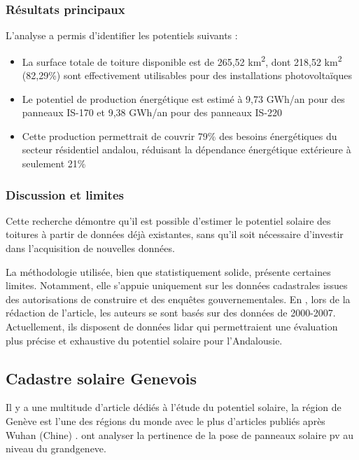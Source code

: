 \subsubsection{Résultats principaux}
\par{L'analyse a permis d'identifier les potentiels suivants :}
\begin{itemize}
    \item La surface totale de toiture disponible est de 265,52 \si{\unit{km^2}}, dont 218,52 \si{\unit{km^2}} (82,29\%) sont effectivement utilisables pour des installations photovoltaïques
    \item Le potentiel de production énergétique est estimé à 9,73 \si{\unit{GWh/an}} pour des panneaux IS-170 et 9,38 \si{\unit{GWh/an}} pour des panneaux IS-220
    \item Cette production permettrait de couvrir 79\% des besoins énergétiques du secteur résidentiel andalou, réduisant la dépendance énergétique extérieure à seulement 21\%
\end{itemize}

\subsubsection{Discussion et limites}
\par{Cette recherche démontre qu'il est possible d'estimer le potentiel solaire des toitures à partir de données déjà existantes, sans qu'il soit nécessaire d'investir dans l’acquisition de nouvelles données.}

\par{La méthodologie utilisée, bien que statistiquement solide, présente certaines limites. Notamment, elle s'appuie uniquement sur les données cadastrales issues des autorisations de construire et des enquêtes gouvernementales. En \citeyear{ordonez_analysis_2010}, lors de la rédaction de l'article, les auteurs se sont basés sur des données de 2000-2007. Actuellement, ils disposent de données \gls{lidar} \cite{nacional_plan_nodate} qui permettraient une évaluation plus précise et exhaustive du potentiel solaire pour l'Andalousie.}

\subsection{Cadastre solaire Genevois}

\par{Il y a une multitude d'article dédiés à l'étude du potentiel solaire, la région de Genève est l'une des régions du monde avec le plus d'articles publiés après Wuhan (Chine) \cite{drozd_evaluating_2025}. \citeauthor{thebault_large-scale_2022} \cite{thebault_large-scale_2022} ont analyser la pertinence de la pose de panneaux solaire \acrshort{pv} au niveau du \gls{grandgeneve}.}

